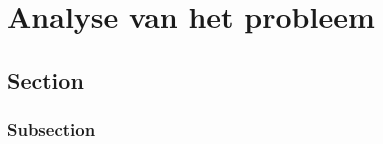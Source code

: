 \chapter{Analyse van het probleem}
\label{Analyse_van_het_probleem}

\section{Section}

\subsection{Subsection}

